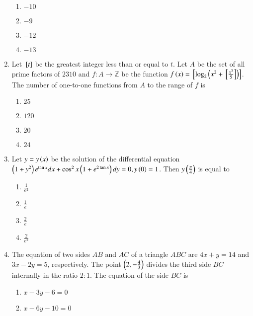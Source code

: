 \documentclass[journal,12pt,onecolumn]{IEEEtran}
\theoremstyle{remark}
\begin{document}
\begin{enumerate}[start=1]
			\begin{enumerate}
				\item $-10$\\
				\item $-9$\\
				\item $-12$\\
				\item $-13$\\
			\end{enumerate}
	\item Let ${}\left[t\right]$ be the greatest integer less than or equal to $t$. Let $A$ be the set of all prime factors of $2310$ and $f:A\to\mathbb{Z}$ be the function $f\left(x\right)={}\left[\log_2\left(x^2+{}\left[\frac{x^3}{5}\right]\right)\right]$. The number of one-to-one functions from $A$ to the range of $f$ is 
		\begin{enumerate}
			\item $25$\\
			\item $120$\\
			\item $20$\\
			\item $24$\\
		\end{enumerate}
	\item Let $y=y\left(x\right)$ be the solution of the differential equation $\left(1+y^2\right)e^{\tan{x}}dx+\cos^2{x}\left(1+e^{2\tan{x}}\right)dy=0,y\left(0\right)=1$. Then $y\left(\frac{\pi}{4}\right)$ is equal to
		\begin{enumerate}
			\item $\frac{1}{e^2}$\\
			\item $\frac{1}{e}$\\
			\item $\frac{2}{e}$\\
			\item $\frac{2}{e^2}$\\
		\end{enumerate}
	\item The equation of two sides $AB$ and $AC$ of a triangle $ABC$ are $4x+y=14$ and $3x-2y=5$, respectively. The point $\left(2,-\frac{4}{3}\right)$ divides the third side $BC$ internally in the ratio $2:1$. The equation of the side $BC$ is
		\begin{enumerate}
			\item $x-3y-6=0$\\
			\item $x-6y-10=0$\\

\end{enumerate}
\end{enumerate}
\end{document}
